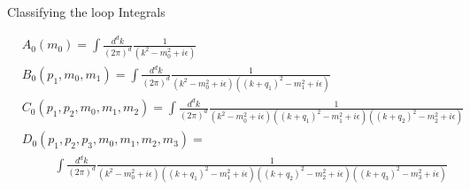 \documentclass[aspectratio=169,usenames,dvipsnames]{beamer}
\begin{document}
\begin{frame}[t]{\centering {}\\ Classifying the loop Integrals}
\begin{tcolorbox}[enhanced,width=\textwidth,colframe=LUCopper,arc=4pt,boxrule=1pt,drop fuzzy shadow]
\scriptsize\begin{align*} 
  &A_0(m_0) =  \int \frac{d^d k}{(2\pi)^d}  \frac{1}{(k^2-{m}^2_0+i\epsilon)}   \\
  &B_0(p_1,m_0,m_1) =  \int \frac{d^d k}{(2\pi)^d}  \frac{1}{(k^2-{m}^2_0+i\epsilon)((k+q_1)^2-{m}^2_1+i\epsilon)} \\
  & C_0(p_1,p_2,m_0,m_1,m_2) =  \int \frac{d^d k}{(2\pi)^d}  \frac{1}{(k^2-{m}^2_0+i\epsilon)((k+q_1)^2-{m}^2_1+i\epsilon)((k+q_2)^2-{m}^2_2+i\epsilon)} \\
  & D_0(p_1,p_2,p_3,m_0,m_1,m_2,m_3) =  \\
  & \qquad\;\,\, \int \frac{d^d k}{(2\pi)^d} \frac{1}{(k^2-{m}^2_0+i\epsilon)((k+q_1)^2-{m}^2_1+i\epsilon)((k+q_2)^2-{m}^2_2+i\epsilon)((k+q_3)^2-{m}^2_3+i\epsilon)} 
\end{align*}  
  \end{tcolorbox}
\vspace{100mm}
\end{frame}
\end{document}
